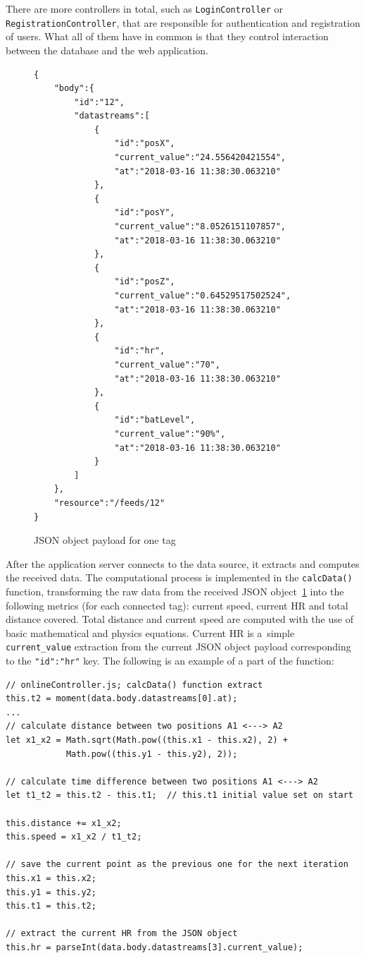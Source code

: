 There are more controllers in total, such as \texttt{LoginController} or \texttt{RegistrationControl\-ler}, that are responsible for authentication and registration of users. What all of them have in common is that they control interaction between the database and the web application.

\begin{figure}[H]
  \begin{verbatim}
{
    "body":{
        "id":"12",
        "datastreams":[
            {
                "id":"posX",
                "current_value":"24.556420421554",
                "at":"2018-03-16 11:38:30.063210"
            },   
            {
                "id":"posY",
                "current_value":"8.0526151107857",
                "at":"2018-03-16 11:38:30.063210"
            },
            {
                "id":"posZ",
                "current_value":"0.64529517502524",
                "at":"2018-03-16 11:38:30.063210"
            },
            {
                "id":"hr",
                "current_value":"70",
                "at":"2018-03-16 11:38:30.063210"
            },
            {
                "id":"batLevel",
                "current_value":"90%",
                "at":"2018-03-16 11:38:30.063210"
            }
        ]
    },
    "resource":"/feeds/12"
}
  \end{verbatim}
  \caption{JSON object payload for one tag}
  \label{jsonobj}
\end{figure}

After the application server connects to the data source, it extracts and computes the received data. The computational process is implemented in the \texttt{calcData()} function, transforming the raw data from the received JSON object~\ref{jsonobj} into the following metrics (for each connected tag): current speed, current HR and total distance covered. Total distance and current speed are computed with the use of basic mathematical and physics equations. Current HR is a~simple \texttt{current\_value} extraction from the current JSON object payload corresponding to the \texttt{"id":"hr"} key. The following is an example of a part of the function:

\newpage
\begin{verbatim}
// onlineController.js; calcData() function extract
this.t2 = moment(data.body.datastreams[0].at);
...
// calculate distance between two positions A1 <---> A2
let x1_x2 = Math.sqrt(Math.pow((this.x1 - this.x2), 2) + 
            Math.pow((this.y1 - this.y2), 2));
            
// calculate time difference between two positions A1 <---> A2
let t1_t2 = this.t2 - this.t1;	// this.t1 initial value set on start

this.distance += x1_x2;
this.speed = x1_x2 / t1_t2;

// save the current point as the previous one for the next iteration
this.x1 = this.x2;
this.y1 = this.y2;
this.t1 = this.t2;
    
// extract the current HR from the JSON object
this.hr = parseInt(data.body.datastreams[3].current_value);
\end{verbatim}

